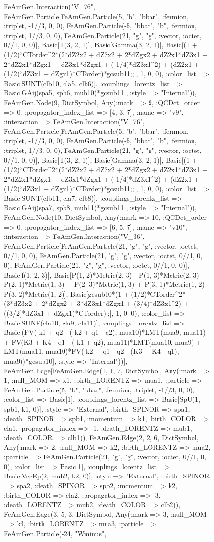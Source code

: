 \documentclass{revtex4}
\begin{document}
\begin{figure}[!htb]
\begin{center}
{FeAmGen.Interaction("V_76", FeAmGen.Particle[FeAmGen.Particle(5, "b", "bbar", :fermion, :triplet, -1//3, 0, 0), FeAmGen.Particle(-5, "bbar", "b", :fermion, :triplet, 1//3, 0, 0), FeAmGen.Particle(21, "g", "g", :vector, :octet, 0//1, 0, 0)], Basic[T(3, 2, 1)], Basic[Gamma(3, 2, 1)], Basic[(1 + (1/2)*CTorder^2*(2*dZ2x2 + dZ3x2 + 2*dZgx2 + dZ2x1*dZ3x1 + 2*dZ2x1*dZgx1 + dZ3x1*dZgx1 + (-1/4)*dZ3x1^2) + (dZ2x1 + (1/2)*dZ3x1 + dZgx1)*CTorder)*gcsub11;;], 1, 0, 0), :color_list => Basic[SUNT(clb10, cla5, clb6)], :couplings_lorentz_list => Basic[GAij(spa5, spb6, mub10)*gcsub11], :style => "Internal")), FeAmGen.Node(9, Dict{Symbol, Any}(:mark => 9, :QCDct_order => 0, :propagator_index_list => [4, 3, 7], :name => "v9", :interaction => FeAmGen.Interaction("V_76", FeAmGen.Particle[FeAmGen.Particle(5, "b", "bbar", :fermion, :triplet, -1//3, 0, 0), FeAmGen.Particle(-5, "bbar", "b", :fermion, :triplet, 1//3, 0, 0), FeAmGen.Particle(21, "g", "g", :vector, :octet, 0//1, 0, 0)], Basic[T(3, 2, 1)], Basic[Gamma(3, 2, 1)], Basic[(1 + (1/2)*CTorder^2*(2*dZ2x2 + dZ3x2 + 2*dZgx2 + dZ2x1*dZ3x1 + 2*dZ2x1*dZgx1 + dZ3x1*dZgx1 + (-1/4)*dZ3x1^2) + (dZ2x1 + (1/2)*dZ3x1 + dZgx1)*CTorder)*gcsub11;;], 1, 0, 0), :color_list => Basic[SUNT(clb11, cla7, clb8)], :couplings_lorentz_list => Basic[GAij(spa7, spb8, mub11)*gcsub11], :style => "Internal")), FeAmGen.Node(10, Dict{Symbol, Any}(:mark => 10, :QCDct_order => 0, :propagator_index_list => [6, 5, 7], :name => "v10", :interaction => FeAmGen.Interaction("V_36", FeAmGen.Particle[FeAmGen.Particle(21, "g", "g", :vector, :octet, 0//1, 0, 0), FeAmGen.Particle(21, "g", "g", :vector, :octet, 0//1, 0, 0), FeAmGen.Particle(21, "g", "g", :vector, :octet, 0//1, 0, 0)], Basic[f(1, 2, 3)], Basic[P(1, 2)*Metric(2, 3) - P(1, 3)*Metric(2, 3) - P(2, 1)*Metric(1, 3) + P(2, 3)*Metric(1, 3) + P(3, 1)*Metric(1, 2) - P(3, 2)*Metric(1, 2)], Basic[gcsub10*(1 + (1/2)*CTorder^2*(3*dZ3x2 + 2*dZgx2 + 3*dZ3x1*dZgx1 + (3/4)*dZ3x1^2) + ((3/2)*dZ3x1 + dZgx1)*CTorder);;], 1, 0, 0), :color_list => Basic[SUNF(cla10, cla9, cla11)], :couplings_lorentz_list => Basic[(FV(-k1 + q2 - (-k2 + q1 - q2), mua10)*LMT(mua9, mua11) + FV(K3 + K4 - q1 - (-k1 + q2), mua11)*LMT(mua10, mua9) + LMT(mua11, mua10)*FV(-k2 + q1 - q2 - (K3 + K4 - q1), mua9))*gcsub10], :style => "Internal"))], FeAmGen.Edge[FeAmGen.Edge(1, 1, 7, Dict{Symbol, Any}(:mark => 1, :null_MOM => k1, :birth_LORENTZ => mua1, :particle => FeAmGen.Particle(5, "b", "bbar", :fermion, :triplet, -1//3, 0, 0), :color_list => Basic[1], :couplings_lorentz_list => Basic[SpU(1, spb1, k1, 0)], :style => "External", :birth_SPINOR => spa1, :death_SPINOR => spb1, :momentum => k1, :birth_COLOR => cla1, :propagator_index => -1, :death_LORENTZ => mub1, :death_COLOR => clb1)), FeAmGen.Edge(2, 2, 6, Dict{Symbol, Any}(:mark => 2, :null_MOM => k2, :birth_LORENTZ => mua2, :particle => FeAmGen.Particle(21, "g", "g", :vector, :octet, 0//1, 0, 0), :color_list => Basic[1], :couplings_lorentz_list => Basic[VecEp(2, mub2, k2, 0)], :style => "External", :birth_SPINOR => spa2, :death_SPINOR => spb2, :momentum => k2, :birth_COLOR => cla2, :propagator_index => -3, :death_LORENTZ => mub2, :death_COLOR => clb2)), FeAmGen.Edge(3, 5, 3, Dict{Symbol, Any}(:mark => 3, :null_MOM => k3, :birth_LORENTZ => mua3, :particle => FeAmGen.Particle(-24, "Wminus", }
\end{center}
\end{figure}
\end{document}
